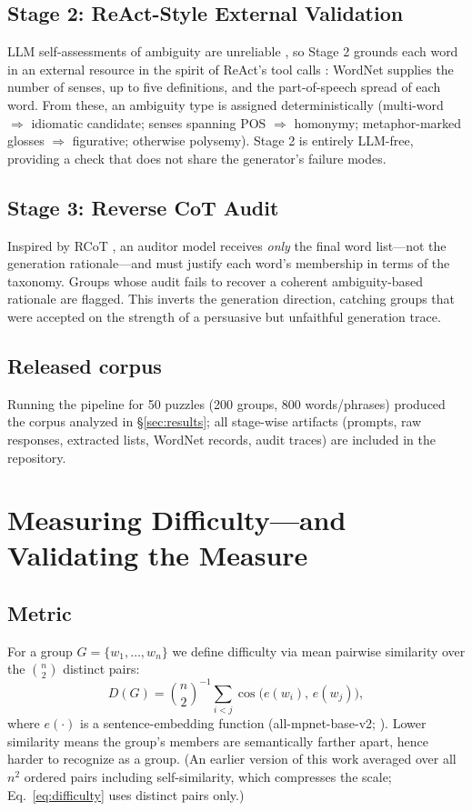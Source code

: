 \documentclass[11pt]{article}
\begin{document}
\subsection{Stage 2: ReAct-Style External Validation}
LLM self-assessments of ambiguity are unreliable \citep{mirzadeh2024gsm}, so Stage 2 grounds each word in an external resource in the spirit of ReAct's tool calls \citep{yao2023react}: WordNet supplies the number of senses, up to five definitions, and the part-of-speech spread of each word. From these, an ambiguity type is assigned deterministically (multi-word $\Rightarrow$ idiomatic candidate; senses spanning POS $\Rightarrow$ homonymy; metaphor-marked glosses $\Rightarrow$ figurative; otherwise polysemy). Stage 2 is entirely LLM-free, providing a check that does not share the generator's failure modes.

\subsection{Stage 3: Reverse CoT Audit}
Inspired by RCoT \citep{xue2023rcot}, an auditor model receives \emph{only} the final word list---not the generation rationale---and must justify each word's membership in terms of the taxonomy. Groups whose audit fails to recover a coherent ambiguity-based rationale are flagged. This inverts the generation direction, catching groups that were accepted on the strength of a persuasive but unfaithful generation trace.

\subsection{Released corpus}
Running the pipeline for 50 puzzles (200 groups, 800 words/phrases) produced the corpus analyzed in \S\ref{sec:results}; all stage-wise artifacts (prompts, raw responses, extracted lists, WordNet records, audit traces) are included in the repository.

\section{Measuring Difficulty---and Validating the Measure}
\label{sec:validation}

\subsection{Metric}
For a group $G=\{w_1,\dots,w_n\}$ we define difficulty via mean pairwise similarity over the $\binom{n}{2}$ distinct pairs:
\begin{equation}
D(G) = \binom{n}{2}^{-1} \sum_{i<j} \cos\!\big(e(w_i),\, e(w_j)\big),
\label{eq:difficulty}
\end{equation}
where $e(\cdot)$ is a sentence-embedding function (all-mpnet-base-v2; \citealp{reimers2019sentence}). Lower similarity means the group's members are semantically farther apart, hence harder to recognize as a group. (An earlier version of this work averaged over all $n^2$ ordered pairs including self-similarity, which compresses the scale; Eq.~\ref{eq:difficulty} uses distinct pairs only.)
\end{document}
